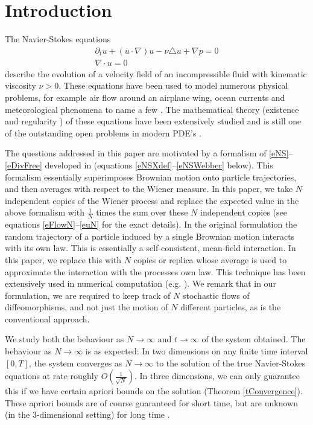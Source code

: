 \documentclass[final]{amsart}%
\newcommand{\slns}{\eqref{eNSXdef}--\eqref{eNSWebber}\xspace}
\newcommand{\nsequations}{\eqref{eNS}--\eqref{eDivFree}\xspace}
\newcommand{\mceuler}{\eqref{eFlowN}--\eqref{euN}\xspace}
\newcommand{\del}{\partial}
\newcommand{\lap}{\triangle}
\newcommand{\grad}{\nabla}
\newcommand{\divergence}{\grad \cdot}
\numberwithin{equation}{section}
\theoremstyle{definition}
\theoremstyle{remark}
\begin{document}
\section{Introduction}%
The Navier-Stokes equations
\begin{gather}
\label{eNS} \del_t u + (u \cdot \grad) u - \nu \lap u + \grad p = 0\\
\label{eDivFree} \divergence u = 0
\end{gather}
describe the evolution of a velocity field of an incompressible fluid
with kinematic viscosity $\nu > 0$. These equations have been used to
model numerous physical problems, for example air flow around an
airplane wing, ocean currents and meteorological phenomena to name a
few \cites{bPedlosky,bChorinMarsden,bLamb}. The mathematical theory
(existence and regularity \cites{bibConstBook,bibLadyzhenskaya}) of
these equations have been extensively studied and is still one of the
outstanding open problems in modern PDE's \cites{constOP,clay}.

The questions addressed in this paper are motivated by a formalism of
\nsequations developed in \cite{detsns} (equations \slns below). This
formalism essentially superimposes Brownian motion onto particle
trajectories, and then averages with respect to the Wiener measure. In
this paper, we take $N$ independent copies of the Wiener process and
replace the expected value in the above formalism with $\frac{1}{N}$
times the sum over these $N$ independent copies (see equations
\mceuler for the exact details). In the original formulation the
random trajectory of a particle induced by a single Brownian motion interacts
with its own law. This is essentially a self-consistent, mean-field
interaction. In this paper, we replace this with $N$ copies or replica
whose average is used to approximate the interaction with the
processes own law.
%
This technique has been extensively used in numerical computation
(e.g. \cites{montecarlo,bRobertCasella,bibBremaud}). We remark
that in our formulation, we are required to keep track of
$N$ stochastic flows of diffeomorphisms, and not just the motion of $N$
different particles, as is the conventional approach.

We study both the behaviour as $N \to \infty$ and $t \to \infty$ of
the system obtained. The behaviour as $N \to \infty$ is as expected:
In two dimensions on any finite time interval $[0,T]$, the system
converges as $N \rightarrow \infty$ to the solution of the true
Navier-Stokes equations at rate roughly $O(\frac{1}{\sqrt{N}})$. In
three dimensions, we can only guarantee this if we have certain
apriori bounds on the solution (Theorem \ref{tConvergence}). These
apriori bounds are of course guaranteed for short time, but are
unknown (in the $3$-dimensional setting) for long time
\cites{clay,constOP}.
\end{document}

